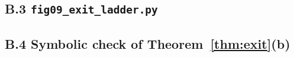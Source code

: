 \documentclass[11pt]{article}
\theoremstyle{definition}
\begin{document}
\subsection*{B.3 \texttt{fig09\_exit\_ladder.py}}

\subsection*{B.4 Symbolic check of Theorem~\ref{thm:exit}(b)}


\end{document}
